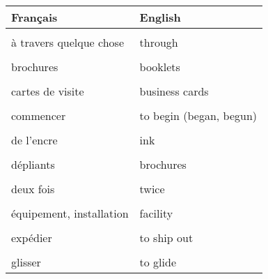 \documentclass[
  10pt,
]{article}
\begin{document}
\begin{longtable}{ll}
\toprule
Français & English\\
\midrule
\cellcolor{gray!6}{alimenter} & \cellcolor{gray!6}{to feed (fed, fed)}\\

à travers quelque chose & through\\

\cellcolor{gray!6}{autocollants} & \cellcolor{gray!6}{stickers}\\

brochures & booklets\\

\cellcolor{gray!6}{bye} & \cellcolor{gray!6}{au revoir}\\

cartes de visite & business cards\\

\cellcolor{gray!6}{charger} & \cellcolor{gray!6}{to load}\\

commencer & to begin (began, begun)\\

\cellcolor{gray!6}{de la poudre} & \cellcolor{gray!6}{powder}\\

de l'encre & ink\\

\cellcolor{gray!6}{de l'huile} & \cellcolor{gray!6}{oil}\\

dépliants & brochures\\

\cellcolor{gray!6}{des agrafes} & \cellcolor{gray!6}{staples}\\

deux fois & twice\\

\cellcolor{gray!6}{dos carré-collé} & \cellcolor{gray!6}{perfect binding}\\

équipement, installation & facility\\

\cellcolor{gray!6}{étape} & \cellcolor{gray!6}{a stage}\\

expédier & to ship out\\

\cellcolor{gray!6}{fonctionner} & \cellcolor{gray!6}{to work}\\

glisser & to glide\\


\end{longtable}
\end{document}
